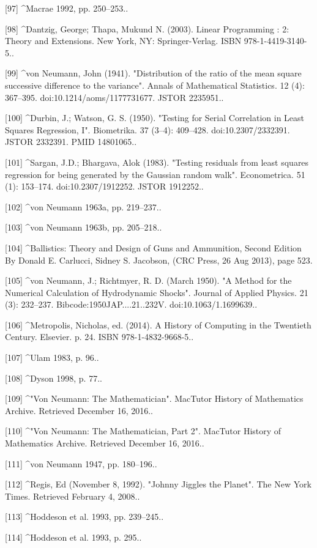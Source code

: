 [97]
^Macrae 1992, pp. 250–253..

[98]
^Dantzig, George; Thapa, Mukund N. (2003). Linear Programming : 2: Theory and Extensions. New York, NY: Springer-Verlag. ISBN 978-1-4419-3140-5..

[99]
^von Neumann, John (1941). "Distribution of the ratio of the mean square successive difference to the variance". Annals of Mathematical Statistics. 12 (4): 367–395. doi:10.1214/aoms/1177731677. JSTOR 2235951..

[100]
^Durbin, J.; Watson, G. S. (1950). "Testing for Serial Correlation in Least Squares Regression, I". Biometrika. 37 (3–4): 409–428. doi:10.2307/2332391. JSTOR 2332391. PMID 14801065..

[101]
^Sargan, J.D.; Bhargava, Alok (1983). "Testing residuals from least squares regression for being generated by the Gaussian random walk". Econometrica. 51 (1): 153–174. doi:10.2307/1912252. JSTOR 1912252..

[102]
^von Neumann 1963a, pp. 219–237..

[103]
^von Neumann 1963b, pp. 205–218..

[104]
^Ballistics: Theory and Design of Guns and Ammunition, Second Edition By Donald E. Carlucci, Sidney S. Jacobson, (CRC Press, 26 Aug 2013), page 523.

[105]
^von Neumann, J.; Richtmyer, R. D. (March 1950). "A Method for the Numerical Calculation of Hydrodynamic Shocks". Journal of Applied Physics. 21 (3): 232–237. Bibcode:1950JAP....21..232V. doi:10.1063/1.1699639..

[106]
^Metropolis, Nicholas, ed. (2014). A History of Computing in the Twentieth Century. Elsevier. p. 24. ISBN 978-1-4832-9668-5..

[107]
^Ulam 1983, p. 96..

[108]
^Dyson 1998, p. 77..

[109]
^"Von Neumann: The Mathematician". MacTutor History of Mathematics Archive. Retrieved December 16, 2016..

[110]
^"Von Neumann: The Mathematician, Part 2". MacTutor History of Mathematics Archive. Retrieved December 16, 2016..

[111]
^von Neumann 1947, pp. 180–196..

[112]
^Regis, Ed (November 8, 1992). "Johnny Jiggles the Planet". The New York Times. Retrieved February 4, 2008..

[113]
^Hoddeson et al. 1993, pp. 239–245..

[114]
^Hoddeson et al. 1993, p. 295..

